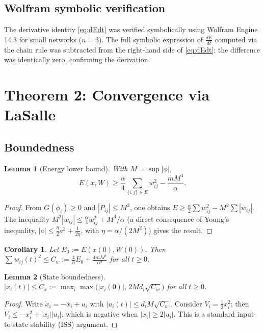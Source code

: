 \documentclass[3p]{elsarticle}
\newtheorem{lemma}{Lemma}
\newtheorem{corollary}{Corollary}
\begin{document}
\subsection{Wolfram symbolic verification}

The derivative identity \eqref{eq:dEdt} was verified symbolically using Wolfram Engine 14.3 for small networks ($n=3$). The full symbolic expression of $\frac{dE}{dt}$ computed via the chain rule was subtracted from the right-hand side of \eqref{eq:dEdt}; the difference was identically zero, confirming the derivation.

\section{Theorem 2: Convergence via LaSalle}

\subsection{Boundedness}

\begin{lemma}[Energy lower bound] \label{lem:Ebound}
  With $M=\sup|\phi|$,
  \[
  E(x,W) \ge \frac{\alpha}{4}\sum_{\{i,j\}\in E} w_{ij}^2 - \frac{m M^4}{\alpha}.
  \]
\end{lemma}

\begin{proof}
  From $G(\phi_i)\ge 0$ and $|P_{ij}|\le M^2$, one obtains
  $E \ge \frac{\alpha}{2}\sum w_{ij}^2 - M^2\sum|w_{ij}|$.
  The inequality $M^2|w_{ij}| \le \frac{\alpha}{4}w_{ij}^2 + M^4/\alpha$ (a direct consequence of Young's inequality, $|a|\le \frac{\eta}{2}a^2+\frac{1}{2\eta}$, with $\eta=\alpha/(2M^2)$) gives the result.
\end{proof}

\begin{corollary} \label{cor:wbound}
  Let $E_0:=E(x(0),W(0))$. Then $\sum w_{ij}(t)^2 \le C_w := \frac{4}{\alpha}E_0 + \frac{4m M^4}{\alpha^2}$ for all $t\ge 0$.
\end{corollary}

\begin{lemma}[State boundedness] \label{lem:xbound}
  $|x_i(t)| \le C_x := \max_i\max\bigl(|x_i(0)|,\, 2M d_i\sqrt{C_w}\bigr)$ for all $t\ge 0$.
\end{lemma}

\begin{proof}
  Write $\dot x_i = -x_i + u_i$ with $|u_i(t)|\le d_i M\sqrt{C_w}$. Consider $V_i = \frac12 x_i^2$; then $\dot V_i \le -x_i^2 + |x_i||u_i|$, which is negative when $|x_i|\ge 2|u_i|$. This is a standard input-to-state stability (ISS) argument.
\end{proof}
\end{document}
